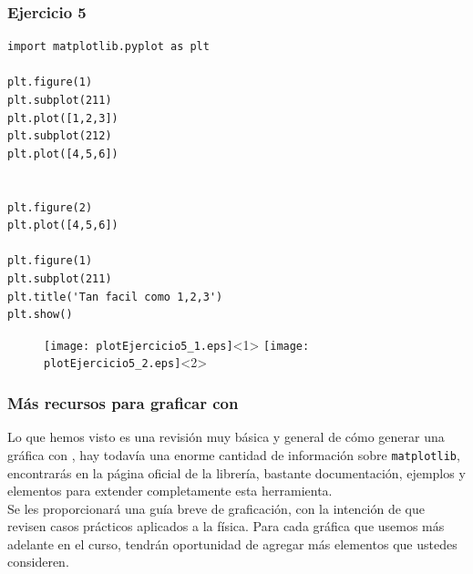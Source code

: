 \begin{frame}[fragile]
\frametitle{Ejercicio 5}
\begin{lstlisting}
import matplotlib.pyplot as plt

plt.figure(1)                
plt.subplot(211)         
plt.plot([1,2,3])
plt.subplot(212)         
plt.plot([4,5,6])


plt.figure(2)                
plt.plot([4,5,6])           

plt.figure(1)                
plt.subplot(211)         
plt.title('Tan facil como 1,2,3')
plt.show()
\end{lstlisting}
\end{frame}
\begin{frame}[fragile]
\begin{figure}
	\centering
	\texttt{[image: plotEjercicio5\_1.eps]}<1>
	\texttt{[image: plotEjercicio5\_2.eps]}<2>
\end{figure}
\end{frame}
\begin{frame}
\frametitle{Más recursos para graficar con \python}
Lo que hemos visto es una revisión muy básica y general de cómo generar una gráfica con \python, hay todavía una enorme cantidad de información sobre \texttt{matplotlib}, encontrarás en la página oficial de la librería, bastante documentación, ejemplos y elementos para extender completamente esta herramienta.
\\
\medskip
\pause
Se les proporcionará una guía breve de graficación, con la intención de que revisen casos prácticos aplicados a la física. Para cada gráfica que usemos más adelante en el curso, tendrán oportunidad de agregar más elementos que ustedes consideren.
\end{frame}
